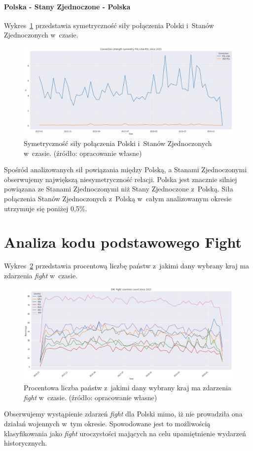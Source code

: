 \documentclass[11pt]{report}
\begin{document}
    \paragraph{Polska - Stany Zjednoczone - Polska}

    Wykres~\ref{fig:POL-USA-POL} przedstawia symetryczność siły połączenia Polski i~Stanów Zjednoczonych w~czasie.
    \begin{figure}[!htp]
        \centering
        \includegraphics[width=\linewidth]{fig/ConnectionSymmetry/POL-USA-POL.png}
        \caption{Symetryczność siły połączenia Polski i~Stanów Zjednoczonych w~czasie. (źródło: opracowanie własne)}
        \label{fig:POL-USA-POL}
    \end{figure}
    Spośród analizowanych sił powiązania między Polską, a Stanami Zjednoczonymi obserwujemy największą niesymetryczność relacji.
    Polska jest znacznie silniej powiązana ze Stanami Zjednoczonymi niż Stany Zjednoczone z~Polską.
    Siła połączenia Stanów Zjednoczonych z~Polską w~całym analizowanym okresie utrzymuje się poniżej 0,5\%.


    \section{Analiza kodu podstawowego Fight}\label{sec:analiza-kodu-podstawowego-fight}

    Wykres~\ref{fig:Fight} przedstawia procentową liczbę państw z~jakimi dany wybrany kraj ma zdarzenia \textit{fight} w~czasie.
    \begin{figure}[!htp]
        \centering
        \includegraphics[width=\linewidth]{fig/ERC/Fight.png}
        \caption{Procentowa liczba państw z~jakimi dany wybrany kraj ma zdarzenia \textit{fight} w~czasie. (źródło: opracowanie własne)}
        \label{fig:Fight}
    \end{figure}
    Obserwujemy wystąpienie zdarzeń \textit{fight} dla Polski mimo, iż nie prowadziła ona działań wojennych w~tym okresie.
    Spowodowane jest to możliwością klasyfikowania jako \textit{fight} uroczystości mających na celu upamiętnienie wydarzeń historycznych.
\end{document}
